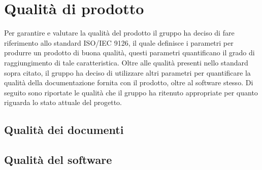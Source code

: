\section{Qualità di prodotto}
	Per garantire e valutare la qualità del prodotto il gruppo ha deciso di fare riferimento allo standard ISO/IEC 9126, il quale definisce i parametri per produrre un prodotto di buona qualità, questi parametri quantificano il grado di raggiungimento di tale caratteristica.
	\newline
	Oltre alle qualità presenti nello standard sopra citato, il gruppo ha deciso di utilizzare altri parametri per quantificare la qualità della documentazione fornita con il prodotto, oltre al software stesso.
	\newline
	Di seguito sono riportate le qualità che il gruppo ha ritenuto appropriate per quanto riguarda lo stato attuale del progetto.
	\subsection{Qualità dei documenti}
		
	\subsection{Qualità del software}
		
		
		
		
		
